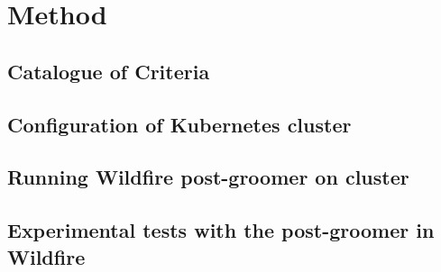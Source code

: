
\chapter{Method}

\section{Catalogue of Criteria}

\section{Configuration of Kubernetes cluster}

\section{Running Wildfire post-groomer on cluster}

\section{Experimental tests with the post-groomer in Wildfire}

